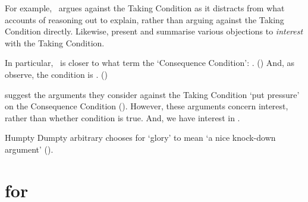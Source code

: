 \begin{note}
{    For example,~\citeauthor{Hlobil:2014tq} argues against the Taking Condition as it distracts from what accounts of reasoning out to explain, rather than arguing against the Taking Condition directly.
    Likewise, \citeauthor{McHugh:2016vp} present and summarise various objections to \emph{interest} with the Taking Condition.

    In particular,~\supportI{} is closer to what \citeauthor{McHugh:2016vp} term the `Consequence Condition': .
    (\citeyear[316]{McHugh:2016vp})
    And, as \citeauthor{McHugh:2016vp} observe, the condition is .
    (\citeyear[316]{McHugh:2016vp})

    \citeauthor{McHugh:2016vp} suggest the arguments they consider against the Taking Condition `put pressure' on the Consequence Condition (\citeyear[327]{McHugh:2016vp}).
    However, these arguments concern interest, rather than whether condition is true.
    And, we have interest in .
  }
\end{note}

\begin{note}
  \color{red}
  Humpty Dumpty arbitrary chooses for `glory' to mean `a nice knock-down argument' (\cite[190]{Carroll:2009aa}).
\end{note}

\section{ for }
\label{cha:ros:W}

